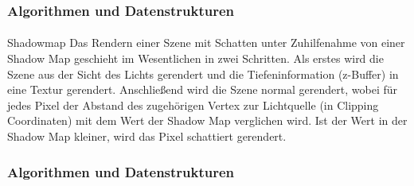 \documentclass{beamer}
\begin{document}
\begin{frame}
    \frametitle{Algorithmen und Datenstrukturen}
\framesubtitle{}
\begin{block}{Shadowmap}
Das Rendern einer Szene mit Schatten unter Zuhilfenahme von einer Shadow Map geschieht im Wesentlichen in zwei Schritten. Als erstes wird die Szene aus der Sicht des Lichts gerendert und die Tiefeninformation (z-Buffer) in eine Textur gerendert. Anschließend wird die Szene normal gerendert, wobei für jedes Pixel  der Abstand des zugehörigen Vertex zur Lichtquelle (in Clipping Coordinaten) mit dem Wert der Shadow Map verglichen wird. Ist der Wert in der Shadow Map kleiner, wird  das Pixel schattiert gerendert.
\end{block}
\end{frame}
\begin{frame}
    \frametitle{Algorithmen und Datenstrukturen}
\framesubtitle{}
\begin{figure}[H]\centering
    \hspace*{0.1\textwidth}
    \vspace*{1em}
\end{figure}

\end{frame}
\end{document}
